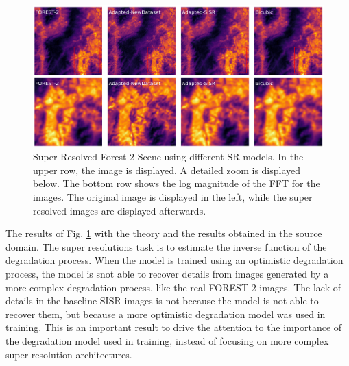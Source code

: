         \begin{figure}[H]
            \centering
            \includegraphics[scale=0.28]{Includes/5-target_prediction_sample.pdf}
            \caption{Super Resolved Forest-2 Scene using different SR models.
                     In the upper row, the image is displayed. A detailed zoom is displayed below. The bottom row shows the log magnitude of the FFT for the images.
                     The original image is displayed in the left, while the super resolved images are displayed afterwards.
                    }
            \label{fig:5-target_prediction_sample}
        \end{figure}

        The results of Fig. \ref{fig:5-target_prediction_sample} with the theory and the results obtained in the source domain.
        The super resolutions task is to estimate the inverse function of the degradation process. 
        When the model is trained using an optimistic degradation process, the model is snot able to recover details from images generated by a more complex degradation process, like the real FOREST-2 images.
        The lack of details in the baseline-SISR images is not because the model is not able to recover them, but because a more optimistic degradation model was used in training. 
        This is an important result to drive the attention to the importance of the degradation model used in training, instead of focusing on more complex super resolution architectures.

